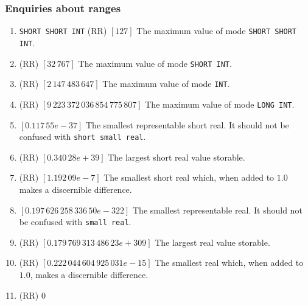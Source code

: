 \subsubsection*{Enquiries about ranges}
\begin{enumerate}
\item \verb|SHORT SHORT INT|  (RR) $[127]$\newline
The maximum value of mode \verb|SHORT SHORT INT|.
\item {} (RR) $[32\,767]$ \newline
The maximum value of mode \verb|SHORT INT|.
\item {} (RR) $[2\,147\,483\,647]$ \newline
The maximum value of mode \verb|INT|.
\item {} (RR)\newline
$[9\,223\,372\,036\,854\,775\,807]$ \newline
The maximum value of mode \verb|LONG INT|.
\item {} $[0.117\,55e-37]$ \newline
The smallest representable short real. It should not be confused with
\verb|short small real|.
\item {} (RR) $[0.340\,28e+39]$ \newline
The largest short real value storable.
\item {} (RR)\newline
$[1.192\,09e-7]$\newline
The smallest short real which, when added to $1.0$ makes a discernible
difference.
\item {}
 $[0.197\,626\,258\,336\,50e-322]$\hfil \newline
The smallest representable real. It should not be confused with
\verb|small real|.
\item {}
 (RR) $[0.179\,769\,313\,486\,23e+309]$\hfil\newline
The largest real value storable.
\item {}
 (RR) $[0.222\,044\,604\,925\,031e-15]$\hfil\newline
The smallest real which, when added to $1.0$, makes a discernible
difference.
\item {} (RR) $0$
\end{enumerate}

